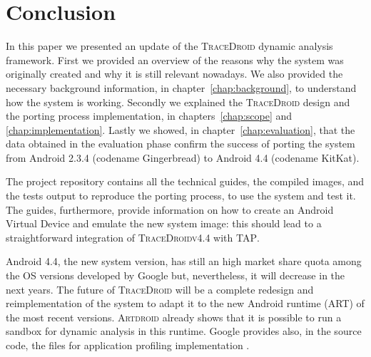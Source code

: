 \chapter{Conclusion}
\label{chap:conclusions}

In this paper we presented an update of the \textsc{TraceDroid} dynamic
analysis framework. First we provided an overview of the reasons why
the system was originally created and why it is still relevant
nowadays. We also provided the necessary background information, in chapter~\ref{chap:background}, to
understand how the system is working. Secondly we explained the
\textsc{TraceDroid} design and the porting process implementation, in chapters~\ref{chap:scope} and \ref{chap:implementation}. Lastly we
showed, in chapter~\ref{chap:evaluation}, that the data obtained in the evaluation phase confirm the
success of porting the system from Android 2.3.4 (codename
Gingerbread) to Android 4.4 (codename KitKat).

The project repository \cite{ref15} contains all the technical guides, the
compiled images, and the tests output to reproduce the porting
process, to use the system and test it. The guides, furthermore,
provide information on how to create an Android Virtual Device and
emulate the new system image: this should lead to a straightforward
integration of \textsc{TraceDroidv4.4} with \textsc{TAP}.

Android 4.4, the new system version, has still an high market share
quota among the OS versions developed by Google but, nevertheless, it
will decrease in the next years. The future of \textsc{TraceDroid} will be a
complete redesign and reimplementation of the system to adapt it to
the new Android runtime (ART) of the most recent versions. \textsc{Artdroid}
\cite{ref28} already shows that it is possible to run a sandbox for dynamic
analysis in this runtime. Google provides also, in the source code,
the files for application profiling implementation \cite{ref29}.
